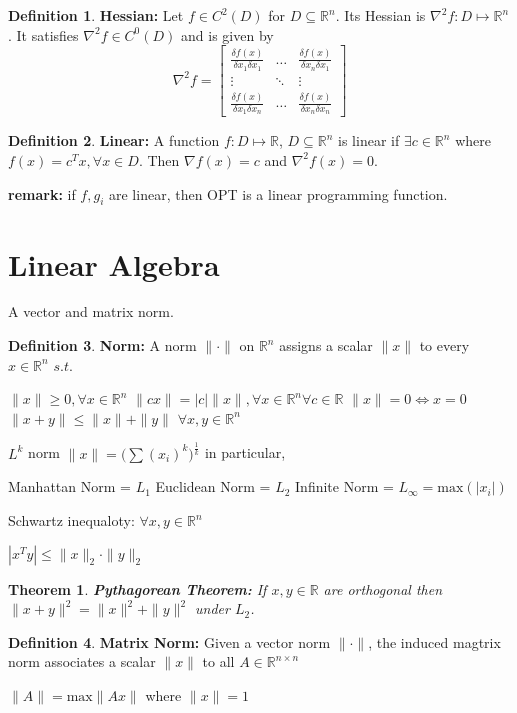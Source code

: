 \documentclass[titlepage]{article}
\theoremstyle{plain}
\newtheorem{thm}{Theorem}[section]
\theoremstyle{definition}
\newtheorem{defn}{Definition}[section]
\theoremstyle{remark}
\begin{document}
\begin{defn}
\textbf{Hessian: } Let $f \in C^2(D)$ for $D\subseteq \mathbb{R}^n$. Its Hessian
is $\nabla^2 f: D\mapsto \mathbb{R}^n$. It satisfies $\nabla^2 f \in C^0(D)$ and
is given by
\[\nabla^2 f =\begin{bmatrix} \frac{\delta f(x)}{\delta x_1 \delta
x_1} & \hdots & \frac{\delta f(x)}{\delta x_n \delta x_1} \\ \vdots & \ddots &
\vdots \\ \frac{\delta f(x)}{\delta x_1 \delta x_n} & \hdots & \frac{\delta
f(x)}{\delta x_n \delta x_n}\end{bmatrix}\]
\end{defn}
\begin{defn}
\textbf{Linear: } A function $f: D \mapsto \mathbb{R}$, $D \subseteq \mathbb{R}^n$
is linear if $\exists c \in \mathbb{R}^n$ where $f(x) = c^T x, \forall x \in D$.
Then $\nabla f(x) = c$ and $\nabla^2 f(x) = 0$.
\end{defn}

\textbf{remark: } if $f, g_i$ are linear, then OPT is a linear programming
function.

\section{Linear Algebra}

A vector and matrix norm.

\begin{defn}
\textbf{Norm: } A norm $\|\cdot \|$ on $\mathbb{R}^n$ assigns a scalar $\|x\|$
to every $x \in \mathbb{R}^n$ $s.t.$
\begin{outline}[enumerate]
\1 $\|x\| \geq 0, \forall x \in \mathbb{R}^n$
\1 $\|cx\| = |c|\|x\|, \forall x \in \mathbb{R}^n \forall c \in \mathbb{R}$
\1 $\|x\| = 0 \iff x = 0$
\1 $\|x + y\| \leq \|x\| + \|y\|$ $\forall x,y \in \mathbb{R}^n$
\end{outline}
\end{defn}
\noindent $L^k$ norm $\|x\| = \big(\sum (x_i)^k\big)^{\frac{1}{k}}$ in particular,
\begin{outline}[enumerate]
\1 Manhattan Norm = $L_1$
\1 Euclidean Norm = $L_2$
\1 Infinite Norm = $L_{\infty} = \text{max}(|x_i|)$
\end{outline}
\noindent Schwartz inequaloty: $\forall x,y \in \mathbb{R}^n$

$|x^T y| \leq \|x\|_2 \cdot \|y\|_2$
\begin{thm}
\textbf{Pythagorean Theorem: } If $x,y \in \mathbb{R}$ are orthogonal then $\|x
+ y\|^2 = \|x\|^2 + \|y\|^2$ under $L_2$.
\end{thm}
\begin{defn}
\textbf{Matrix Norm: } Given a vector norm $\| \cdot \|$, the induced magtrix
norm associates a scalar $\|x\|$ to all $A \in \mathbb{R}^{n \times n}$

$\|A\| = \text{max} \|Ax\|$ where $\|x\| = 1$
\end{defn}
\end{document}
